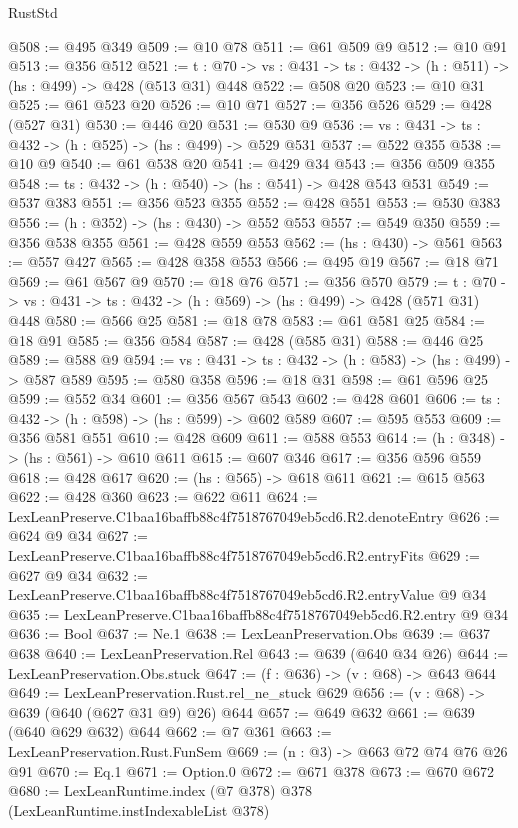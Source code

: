 \begin{lexlean}{RustStd}
\begin{coremodule}
@508 := @495 @349
@509 := @10 @78
@511 := @61 @509 @9
@512 := @10 @91
@513 := @356 @512
@521 := {t : @70} -> {vs : @431} -> {ts : @432} -> (h : @511) -> (hs : @499) -> @428 (@513 @31) @448
@522 := @508 @20
@523 := @10 @31
@525 := @61 @523 @20
@526 := @10 @71
@527 := @356 @526
@529 := @428 (@527 @31)
@530 := @446 @20
@531 := @530 @9
@536 := {vs : @431} -> {ts : @432} -> (h : @525) -> (hs : @499) -> @529 @531
@537 := @522 @355
@538 := @10 @9
@540 := @61 @538 @20
@541 := @429 @34
@543 := @356 @509 @355
@548 := {ts : @432} -> (h : @540) -> (hs : @541) -> @428 @543 @531
@549 := @537 @383
@551 := @356 @523 @355
@552 := @428 @551
@553 := @530 @383
@556 := (h : @352) -> (hs : @430) -> @552 @553
@557 := @549 @350
@559 := @356 @538 @355
@561 := @428 @559 @553
@562 := (hs : @430) -> @561
@563 := @557 @427
@565 := @428 @358 @553
@566 := @495 @19
@567 := @18 @71
@569 := @61 @567 @9
@570 := @18 @76
@571 := @356 @570
@579 := {t : @70} -> {vs : @431} -> {ts : @432} -> (h : @569) -> (hs : @499) -> @428 (@571 @31) @448
@580 := @566 @25
@581 := @18 @78
@583 := @61 @581 @25
@584 := @18 @91
@585 := @356 @584
@587 := @428 (@585 @31)
@588 := @446 @25
@589 := @588 @9
@594 := {vs : @431} -> {ts : @432} -> (h : @583) -> (hs : @499) -> @587 @589
@595 := @580 @358
@596 := @18 @31
@598 := @61 @596 @25
@599 := @552 @34
@601 := @356 @567 @543
@602 := @428 @601
@606 := {ts : @432} -> (h : @598) -> (hs : @599) -> @602 @589
@607 := @595 @553
@609 := @356 @581 @551
@610 := @428 @609
@611 := @588 @553
@614 := (h : @348) -> (hs : @561) -> @610 @611
@615 := @607 @346
@617 := @356 @596 @559
@618 := @428 @617
@620 := (hs : @565) -> @618 @611
@621 := @615 @563
@622 := @428 @360
@623 := @622 @611
@624 := LexLeanPreserve.C1baa16baffb88c4f7518767049eb5cd6.R2.denoteEntry
@626 := @624 @9 @34
@627 := LexLeanPreserve.C1baa16baffb88c4f7518767049eb5cd6.R2.entryFits
@629 := @627 @9 @34
@632 := LexLeanPreserve.C1baa16baffb88c4f7518767049eb5cd6.R2.entryValue @9 @34
@635 := LexLeanPreserve.C1baa16baffb88c4f7518767049eb5cd6.R2.entry @9 @34
@636 := Bool
@637 := Ne.{1}
@638 := LexLeanPreservation.Obs
@639 := @637 @638
@640 := LexLeanPreservation.Rel
@643 := @639 (@640 @34 @26)
@644 := LexLeanPreservation.Obs.stuck
@647 := (f : @636) -> (v : @68) -> @643 @644
@649 := LexLeanPreservation.Rust.rel_ne_stuck @629
@656 := (v : @68) -> @639 (@640 (@627 @31 @9) @26) @644
@657 := @649 @632
@661 := @639 (@640 @629 @632) @644
@662 := @7 @361
@663 := LexLeanPreservation.Rust.FunSem
@669 := (n : @3) -> @663 @72 @74 @76 @26 @91
@670 := Eq.{1}
@671 := Option.{0}
@672 := @671 @378
@673 := @670 @672
@680 := LexLeanRuntime.index (@7 @378) @378 (LexLeanRuntime.instIndexableList @378)

\end{coremodule}
\end{lexlean}
